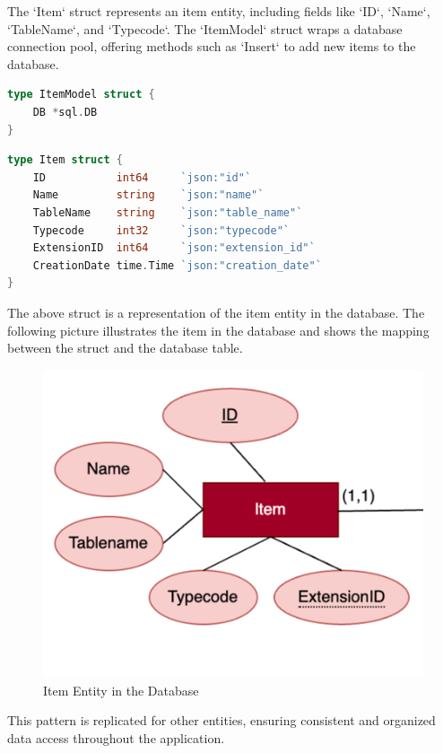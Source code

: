 The `Item` struct represents an item entity, including fields like `ID`, `Name`, `TableName`, and `Typecode`.
The `ItemModel` struct wraps a database connection pool, offering methods such as `Insert` to add new items to the database.

\begin{lstlisting}[language=Go,label={lst:lstlisting17}]
type ItemModel struct {
	DB *sql.DB
}
\end{lstlisting}

\begin{lstlisting}[language=Go,label={lst:lstlisting2}]
type Item struct {
    ID           int64     `json:"id"`
    Name         string    `json:"name"`
    TableName    string    `json:"table_name"`
    Typecode     int32     `json:"typecode"`
    ExtensionID  int64     `json:"extension_id"`
    CreationDate time.Time `json:"creation_date"`
}
\end{lstlisting}

The above struct is a representation of the item entity in the database.
The following picture illustrates the item in the database and shows the mapping between the struct and the database table.

\begin{figure}[ht]
    \centering
    \includegraphics[scale=0.4]{./images/database/item_er}
    \caption{Item Entity in the Database}
    \label{fig:item_database_model}
\end{figure}

This pattern is replicated for other entities, ensuring consistent and organized data access throughout the application.

